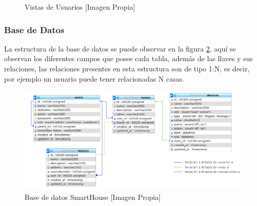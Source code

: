 \begin{figure}[!t]
	\centering
	\caption{Vistas de Usuarios [Imagen Propia]}
	\label{fig:views}
\end{figure}

\subsubsection{Base de Datos}

La estructura de la base de datos se puede observar en la figura \ref{fig:db}, aquí se observan los diferentes campos que posee cada tabla, además de las llaves y sus relaciones, las relaciones presentes en esta estructura son de tipo 1:N, es decir, por ejemplo un usuario puede tener relacionadas N casas.\\  

\begin{figure}[!t]
\centering
\caption{Base de datos SmartHouse [Imagen Propia]}
\label{fig:db}
\includegraphics[width=0.8\linewidth]{Imagenes/DB}
\end{figure}


